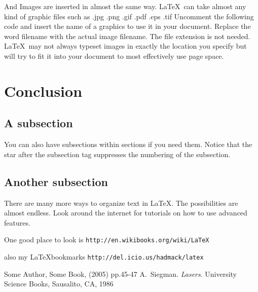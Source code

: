 \documentclass[10pt]{article}
\begin{document}
And Images are inserted in almost the same way.  \LaTeX~can take almost any kind of graphic files such as .jpg .png .gif .pdf .eps .tif
Uncomment the following code and insert the name of a graphics to use it in your document.  Replace the word filename with the actual image filename.  The file extension is not needed.  \LaTeX~may not always typeset images in exactly the location you specify but will try to fit it into your document to most effectively use page space.


\section{Conclusion}

\subsection*{A subsection}
You can also have subsections within sections if you need them.  Notice that the star after the subsection tag suppresses the numbering of the subsection.  

\subsection*{Another subsection}
There are many more ways to organize text in \LaTeX.  The possibilities are almost endless.  Look around the internet for tutorials on how to use advanced features.

One good place to look is  {\tt http://en.wikibooks.org/wiki/LaTeX}

also my \LaTeX bookmarks {\tt http://del.icio.us/hadmack/latex}


\begin{thebibliography}{10} 
 Some Author,
Some Book, (2005) pp.45-47
 A. Siegman. \emph{Lasers}. University Science Books, Sausalito, CA, 1986
\end{thebibliography}
\end{document}
